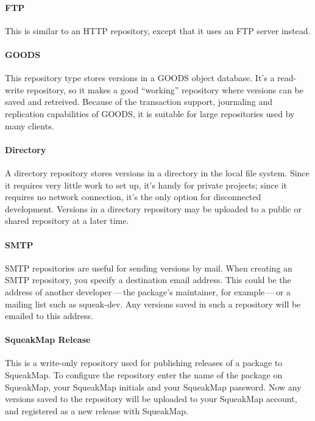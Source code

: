 \documentclass[a4paper,10pt,twoside]{book}
\begin{document}
\paragraph{FTP} This is similar to an HTTP repository, except that it uses an FTP server instead.  

\paragraph{GOODS} This repository type stores versions in a GOODS object database. It's a read-write repository, so it makes a good ``working'' repository where versions can be saved and retreived. Because of the transaction support, journaling and replication capabilities of GOODS, it is suitable for large repositories used by many clients.  

\paragraph{Directory} A directory repository stores versions in a directory in the local file system. Since it requires very little work to set up, it's handy for private projects; since it requires no network connection, it's the only option for disconnected development. Versions in a directory repository may be uploaded  to a public or shared repository at a later time. 

\paragraph{SMTP} SMTP repositories are useful for sending versions by mail. When creating an SMTP repository, you specify a destination email address. This could be the address of another developer\,---\,the package's maintainer, for example\,---\,or a mailing list such as squeak-dev. Any versions saved in such a repository will be emailed to this address.   

\paragraph{SqueakMap Release} This is a write-only repository used for publishing releases of a package to SqueakMap. To configure the repository enter the name of the package on SqueakMap, your SqueakMap initials and your SqueakMap password. Now any versions saved to the repository will be uploaded to your SqueakMap account, and registered as a new release with SqueakMap.  
\end{document}
